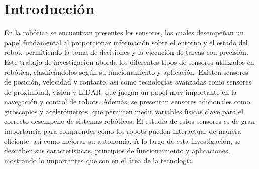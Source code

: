 \section{Introducción}
En la robótica se encuentran presentes los sensores, los cuales desempeñan un papel fundamental al proporcionar información sobre el entorno y el estado del robot, permitiendo la toma de decisiones y la ejecución de tareas con precisión. Este trabajo de investigación aborda los diferentes tipos de sensores utilizados en robótica, clasificándolos según su funcionamiento y aplicación.
Existen sensores de posición, velocidad y contacto, así como tecnologías avanzadas como sensores de proximidad, visión y LiDAR, que juegan un papel muy importante en la navegación y control de robots. Además, se presentan sensores adicionales como giroscopios y acelerómetros, que permiten medir variables físicas clave para el correcto desempeño de sistemas robóticos.
El estudio de estos sensores es de gran importancia para comprender cómo los robots pueden interactuar de manera eficiente, así como mejorar su autonomía. A lo largo de esta investigación, se describen sus características, principios de funcionamiento y aplicaciones, mostrando lo importantes que son en el área de la tecnología.
